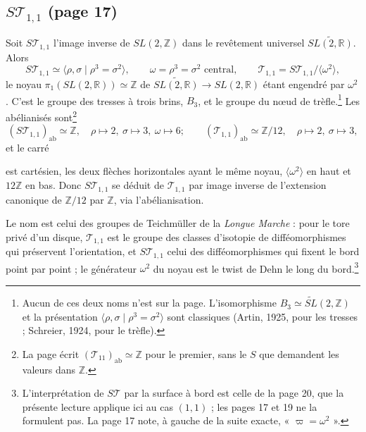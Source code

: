 \documentclass[11pt,a4paper]{article}
\begin{document}
\subsection*{$S\mathcal{T}_{1,1}$ (page 17)}

Soit $S\mathcal{T}_{1,1}$ l'image inverse de $SL(2, \mathbb{Z})$ dans le revêtement
universel $\widetilde{SL(2, \mathbb{R})}$. Alors
\[
S\mathcal{T}_{1,1} \simeq \langle \rho, \sigma \mid \rho^3 = \sigma^2 \rangle,
\qquad \omega = \rho^3 = \sigma^2 \text{ central}, \qquad
\mathcal{T}_{1,1} = S\mathcal{T}_{1,1}/\langle \omega^2 \rangle ,
\]
le noyau $\pi_1(SL(2, \mathbb{R})) \simeq \mathbb{Z}$ de
$\widetilde{SL(2, \mathbb{R})} \to SL(2, \mathbb{R})$ étant engendré par $\omega^2$.
C'est le groupe des tresses à trois brins, $B_3$, et le groupe du nœud de
trèfle.\footnote{Aucun de ces deux noms n'est sur la page. L'isomorphisme
$B_3 \simeq \widetilde{SL}(2, \mathbb{Z})$ et la présentation
$\langle \rho, \sigma \mid \rho^3 = \sigma^2 \rangle$ sont classiques (Artin,
1925, pour les tresses ; Schreier, 1924, pour le trèfle).} Les abélianisés sont\footnote{La page écrit $(\mathcal{T}_{11})_{\mathrm{ab}} \simeq \mathbb{Z}$ pour
le premier, sans le $S$ que demandent les valeurs dans $\mathbb{Z}$.}
\[
(S\mathcal{T}_{1,1})_{\mathrm{ab}} \simeq \mathbb{Z}, \quad
\rho \mapsto 2,\ \sigma \mapsto 3,\ \omega \mapsto 6 ;
\qquad
(\mathcal{T}_{1,1})_{\mathrm{ab}} \simeq \mathbb{Z}/12, \quad
\rho \mapsto 2,\ \sigma \mapsto 3 ,
\]
 et le carré


est cartésien, les deux flèches horizontales ayant le même noyau,
$\langle \omega^2 \rangle$ en haut et $12\mathbb{Z}$ en bas. Donc
$S\mathcal{T}_{1,1}$ se déduit de $\mathcal{T}_{1,1}$ par image inverse de
l'extension canonique de $\mathbb{Z}/12$ par $\mathbb{Z}$, via l'abélianisation.

Le nom est celui des groupes de Teichmüller de la \emph{Longue Marche} : pour le
tore privé d'un disque, $\mathcal{T}_{1,1}$ est le groupe des classes
d'isotopie de difféomorphismes qui préservent l'orientation, et
$S\mathcal{T}_{1,1}$ celui des difféomorphismes qui fixent le bord point par
point ; le générateur $\omega^2$ du noyau est le twist de Dehn le long du
bord.\footnote{L'interprétation de $S\mathcal{T}$ par la surface à bord est
celle de la page 20, que la présente lecture applique ici au cas $(1,1)$ ; les
pages 17 et 19 ne la formulent pas. La page 17 note, à gauche de la suite
exacte, « $\varpi = \omega^2$ ».}
\end{document}
